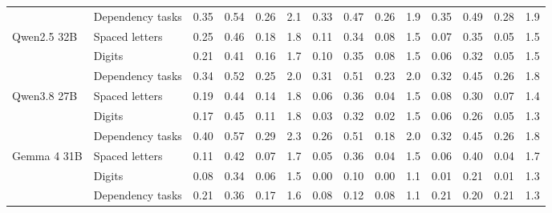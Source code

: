 \begin{tabular}{ll cccc cccc cccc}
 & Dependency tasks & 0.35 & 0.54 & 0.26 & 2.1 & 0.33 & 0.47 & 0.26 & 1.9 & 0.35 & 0.49 & 0.28 & 1.9 \\
Qwen2.5 32B & Spaced letters & 0.25 & 0.46 & 0.18 & 1.8 & 0.11 & 0.34 & 0.08 & 1.5 & 0.07 & 0.35 & 0.05 & 1.5 \\
 & Digits & 0.21 & 0.41 & 0.16 & 1.7 & 0.10 & 0.35 & 0.08 & 1.5 & 0.06 & 0.32 & 0.05 & 1.5 \\
 & Dependency tasks & 0.34 & 0.52 & 0.25 & 2.0 & 0.31 & 0.51 & 0.23 & 2.0 & 0.32 & 0.45 & 0.26 & 1.8 \\
Qwen3.8 27B & Spaced letters & 0.19 & 0.44 & 0.14 & 1.8 & 0.06 & 0.36 & 0.04 & 1.5 & 0.08 & 0.30 & 0.07 & 1.4 \\
 & Digits & 0.17 & 0.45 & 0.11 & 1.8 & 0.03 & 0.32 & 0.02 & 1.5 & 0.06 & 0.26 & 0.05 & 1.3 \\
 & Dependency tasks & 0.40 & 0.57 & 0.29 & 2.3 & 0.26 & 0.51 & 0.18 & 2.0 & 0.32 & 0.45 & 0.26 & 1.8 \\
Gemma 4 31B & Spaced letters & 0.11 & 0.42 & 0.07 & 1.7 & 0.05 & 0.36 & 0.04 & 1.5 & 0.06 & 0.40 & 0.04 & 1.7 \\
 & Digits & 0.08 & 0.34 & 0.06 & 1.5 & 0.00 & 0.10 & 0.00 & 1.1 & 0.01 & 0.21 & 0.01 & 1.3 \\
 & Dependency tasks & 0.21 & 0.36 & 0.17 & 1.6 & 0.08 & 0.12 & 0.08 & 1.1 & 0.21 & 0.20 & 0.21 & 1.3 \\
\bottomrule
\end{tabular}
